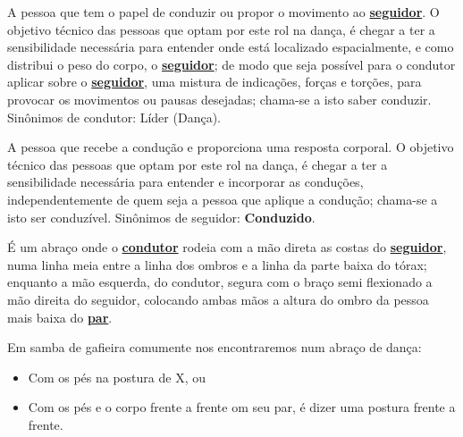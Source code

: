 \begin{definition} 
\label{def:Condutor} 
A pessoa que tem o papel de conduzir ou propor o movimento ao \hyperref[def:Seguidor]{\textbf{seguidor}}. 
O objetivo técnico das pessoas que optam por este rol na dança, é chegar 
a ter a sensibilidade necessária para entender onde está localizado espacialmente, 
e como distribui o peso do corpo, o \hyperref[def:Seguidor]{\textbf{seguidor}}; 
de modo que seja possível para o condutor aplicar sobre o \hyperref[def:Seguidor]{\textbf{seguidor}}, 
uma mistura de indicações, forças e torções,  
para provocar os movimentos ou pausas desejadas;
chama-se a isto saber conduzir.
Sinônimos de condutor: Líder (Dança).
\end{definition}

\begin{definition} 
\label{def:Seguidor} 
A pessoa que recebe a condução e proporciona uma resposta corporal. 
O objetivo técnico das pessoas que optam por este rol na dança, é chegar 
a ter a sensibilidade necessária para entender e incorporar as conduções,
independentemente de quem seja a pessoa que aplique a condução;
chama-se a isto ser conduzível.
Sinônimos de seguidor: \textbf{Conduzido}.
\end{definition}



\begin{definition}
\label{def:abracodedanca}  
É um abraço onde o \hyperref[def:Condutor]{\textbf{condutor}} 
rodeia com a mão direta as costas do \hyperref[def:Seguidor]{\textbf{seguidor}},
numa linha meia entre a linha dos ombros e a linha da parte baixa do tórax;
enquanto a mão esquerda, do condutor, segura com o braço semi flexionado a mão direita do seguidor,
colocando ambas mãos a altura do ombro da pessoa mais baixa do \hyperref[def:Par]{\textbf{par}}.

Em samba de gafieira comumente nos encontraremos num abraço de dança:
\begin{itemize}
\item Com os pés na postura de X, ou
\item Com os pés e o corpo frente a frente om seu par, é dizer uma postura frente a frente.
\end{itemize}
\end{definition}


